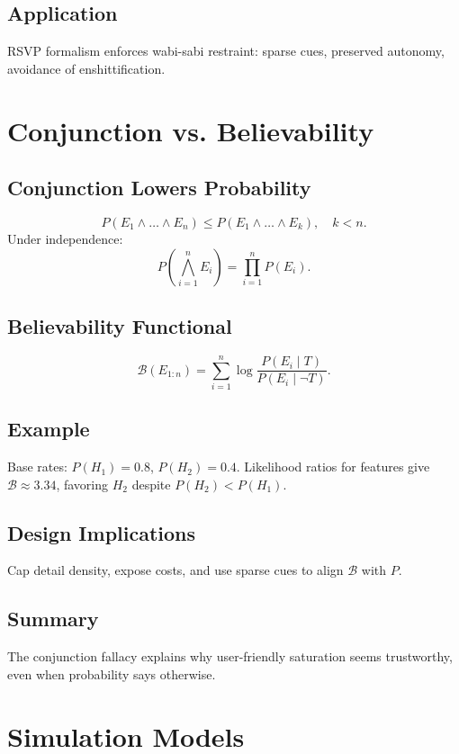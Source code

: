 \documentclass[openany]{book}
\begin{document}
\section{Application}
\label{sec:rsvp-application}
RSVP formalism enforces wabi-sabi restraint: sparse cues, preserved autonomy, avoidance of enshittification.

\chapter{Conjunction vs. Believability}
\label{app:conjunction}

\section{Conjunction Lowers Probability}
\[
P(E_1\land\dots\land E_n) \leq P(E_1\land\dots\land E_k), \quad k<n.
\]
Under independence:
\[
P\!\left(\bigwedge_{i=1}^n E_i\right) = \prod_{i=1}^n P(E_i).
\]

\section{Believability Functional}
\[
\mathcal{B}(E_{1:n}) = \sum_{i=1}^n \log \frac{P(E_i\mid T)}{P(E_i\mid \neg T)}.
\]

\section{Example}
Base rates: $P(H_1)=0.8$, $P(H_2)=0.4$.  
Likelihood ratios for features give $\mathcal{B}\approx 3.34$, favoring $H_2$ despite $P(H_2)<P(H_1)$.

\section{Design Implications}
Cap detail density, expose costs, and use sparse cues to align $\mathcal{B}$ with $P$.

\section{Summary}
The conjunction fallacy explains why user-friendly saturation seems trustworthy, even when probability says otherwise.

\chapter{Simulation Models}
\label{app:simulation}
\end{document}
